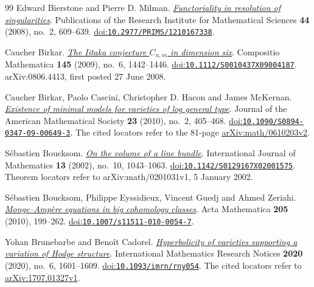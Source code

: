 \begin{thebibliography}{99}
Edward Bierstone and Pierre D. Milman.
\emph{\href{https://ems.press/journals/prims/articles/2154}{Functoriality in resolution of singularities}}.
Publications of the Research Institute for Mathematical Sciences \textbf{44} (2008), no.~2, 609--639.
\href{https://doi.org/10.2977/PRIMS/1210167338}{doi:\nolinkurl{10.2977/PRIMS/1210167338}}.

Caucher Birkar.
\emph{\href{https://arxiv.org/abs/0806.4413}{The {Iitaka} conjecture {$C_{n,m}$} in dimension six}}.
Compositio Mathematica \textbf{145} (2009), no.~6, 1442--1446.
\href{https://doi.org/10.1112/S0010437X09004187}{doi:\nolinkurl{10.1112/S0010437X09004187}}.
arXiv:0806.4413, first posted 27 June 2008.

Caucher Birkar, Paolo Cascini, Christopher D. Hacon and James McKernan.
\emph{\href{https://arxiv.org/abs/math/0610203v2}{Existence of minimal models for varieties of log general type}}.
Journal of the American Mathematical Society \textbf{23} (2010), no.~2, 405--468.
\href{https://doi.org/10.1090/S0894-0347-09-00649-3}{doi:\nolinkurl{10.1090/S0894-0347-09-00649-3}}.
The cited locators refer to the 81-page \href{https://arxiv.org/abs/math/0610203v2}{arXiv:math/0610203v2}.

S{\'e}bastien Boucksom.
\emph{\href{https://arxiv.org/abs/math/0201031v1}{On the volume of a line bundle}}.
International Journal of Mathematics \textbf{13} (2002), no.~10, 1043--1063.
\href{https://doi.org/10.1142/S0129167X02001575}{doi:\nolinkurl{10.1142/S0129167X02001575}}.
Theorem locators refer to arXiv:math/0201031v1, 5 January 2002.

S{\'e}bastien Boucksom, Philippe Eyssidieux, Vincent Guedj and Ahmed Zeriahi.
\emph{\href{https://www.math.univ-toulouse.fr/~guedj/fichierspdf/BEGZ10.pdf}{{Monge--Amp{\`e}re} equations in big cohomology classes}}.
Acta Mathematica \textbf{205} (2010), 199--262.
\href{https://doi.org/10.1007/s11511-010-0054-7}{doi:\nolinkurl{10.1007/s11511-010-0054-7}}.

Yohan Brunebarbe and Beno{\^i}t Cadorel.
\emph{\href{https://arxiv.org/abs/1707.01327v1}{Hyperbolicity of varieties supporting a variation of {Hodge} structure}}.
International Mathematics Research Notices \textbf{2020} (2020), no.~6, 1601--1609.
\href{https://doi.org/10.1093/imrn/rny054}{doi:\nolinkurl{10.1093/imrn/rny054}}.
The cited locators refer to \href{https://arxiv.org/abs/1707.01327v1}{arXiv:1707.01327v1}.


\end{thebibliography}
